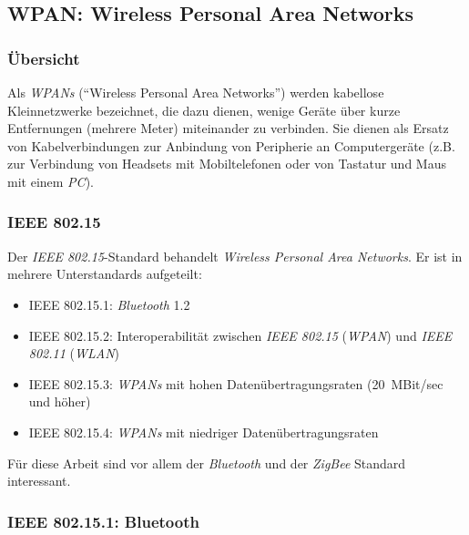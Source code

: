     \subsection{WPAN: Wireless Personal Area Networks}
        \subsubsection{Übersicht}
            Als \emph{WPANs} ("`Wireless Personal Area Networks"') werden kabellose Kleinnetzwerke bezeichnet, die dazu 
            dienen, wenige Geräte über kurze Entfernungen (mehrere Meter) miteinander zu verbinden. Sie dienen als Ersatz 
            von Kabelverbindungen zur Anbindung von Peripherie an Computergeräte (z.B. zur Verbindung von
            Headsets mit Mobiltelefonen oder von Tastatur und Maus mit einem \emph{PC}).
            

        \subsubsection{IEEE 802.15}
            Der \emph{IEEE 802.15}-Standard behandelt \textsl{Wireless Personal Area Networks}. Er ist in mehrere 
            Unterstandards aufgeteilt:

             \begin{itemize}
                \item{IEEE 802.15.1:} \emph{Bluetooth} 1.2
                \item{IEEE 802.15.2:} Interoperabilität zwischen \emph{IEEE 802.15} (\emph{WPAN}) 
                                      und \emph{IEEE 802.11} (\emph{WLAN})
                \item{IEEE 802.15.3:} \emph{WPANs} mit hohen Datenübertragungsraten (20~MBit/sec und höher)
                \item{IEEE 802.15.4:} \emph{WPANs} mit niedriger Datenübertragungsraten
            \end{itemize}

            Für diese Arbeit sind vor allem der \emph{Bluetooth} und der \emph{ZigBee} Standard interessant. 

        \subsubsection{IEEE 802.15.1: Bluetooth}
